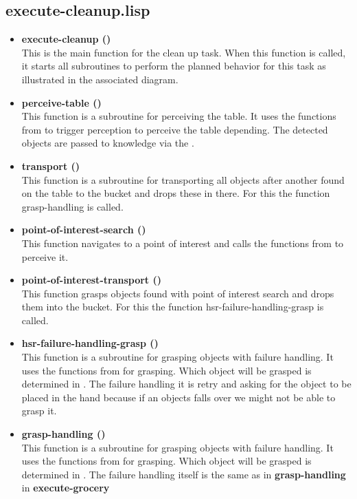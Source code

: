 \documentclass[main.tex]{subfiles}
\begin{document}
	  	\subsection{execute-cleanup.lisp}
	  	\begin{itemize}
			\item \textbf{execute-cleanup ()} \\
			This is the main function for the clean up task. When this function is called, it starts all subroutines to perform the planned behavior for this task as illustrated in the associated diagram.
			\item \textbf{perceive-table ()} \\
			This function is a subroutine for perceiving the table. It uses the functions from  to trigger perception to perceive the table depending. The detected objects are passed to knowledge via the .
			\item \textbf{transport ()} \\
            This function is a subroutine for transporting all objects after another found on the table to the bucket and drops these in there. For this the function grasp-handling is called.
			\item \textbf{point-of-interest-search ()} \\
			This function navigates to a point of interest and calls the functions from  to perceive it. 
			\item \textbf{point-of-interest-transport ()} \\
			This function grasps objects found with point of interest search and drops them into the bucket. For this the function hsr-failure-handling-grasp is called.
			\item \textbf{hsr-failure-handling-grasp ()} \\
			This function is a subroutine for grasping objects with failure handling. It uses the functions from  for grasping. Which object will be grasped is determined in . The failure handling it is retry and asking for the object to be placed in the hand because if an objects falls over we might not be  able to grasp it.
			\item \textbf{grasp-handling ()}\\
			This function is a subroutine for grasping objects with failure handling. It uses the functions from  for grasping. Which object will be grasped is determined in . The failure handling itself is the same as in   
\textbf{grasp-handling} in \textbf{execute-grocery}
		\end{itemize}
\end{document}
